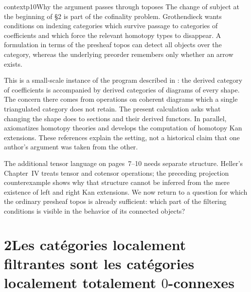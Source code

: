 
\begin{dcomment}{context}{p10}{Why the argument passes through toposes}
The change of subject at the beginning of \S2 is part of the cofinality problem. Grothendieck wants conditions on indexing categories which survive passage to categories of coefficients and which force the relevant homotopy types to disappear. A formulation in terms of the presheaf topos can detect all objects over the category, whereas the underlying preorder remembers only whether an arrow exists.

This is a small-scale instance of the program described in \citet[\S69, especially the discussion of diagram categories on pp.~1--3 of the excerpt]{Grothendieck1983}: the derived category of coefficients is accompanied by derived categories of diagrams of every shape. The concern there comes from operations on coherent diagrams which a single triangulated category does not retain. The present calculation asks what changing the shape does to sections and their derived functors. In parallel, \citet[Chapter~II, \S1; Chapter~III, \S2]{Heller1988} axiomatizes homotopy theories and develops the computation of homotopy Kan extensions. These references explain the setting, not a historical claim that one author's argument was taken from the other.

The additional tensor language on pages~7--10 needs separate structure. Heller's Chapter~IV treats tensor and cotensor operations; the preceding projection counterexample shows why that structure cannot be inferred from the mere existence of left and right Kan extensions. We now return to a question for which the ordinary presheaf topos is already sufficient: which part of the filtering conditions is visible in the behavior of its connected objects?
\end{dcomment}


\section*{2\quad Les catégories localement filtrantes sont les catégories localement totalement $0$-connexes}

